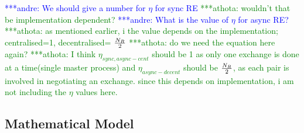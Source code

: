 \documentclass{rspublic}
\newcommand{\alnote}[1]{ {\textcolor{blue} { ***andre: #1 }}}
\newcommand{\athotanote}[1]{ {\textcolor{green} { ***athota: #1 }}}
\newcommand{\alnote}[1]{}
\newcommand{\athotanote}[1]{}
\begin{document}








\alnote{We should give a number for $\eta$ for sync
  RE}\athotanote{wouldn't that be implementation dependent?}
\alnote{What is the value of $\eta$ for async RE?} \athotanote{as
  mentioned earlier, i the value depends on the implementation;
  centralised=1, decentralised= $N_R\over2$} \athotanote{do we need
  the equation here again?}  \athotanote{I think
  $\eta_{sync,async-cent}$ should be 1 as only one exchange is done at
  a time(single master process) and $\eta_{async-decent}$ should be
  $N_R \over 2$, as each pair is involved in negotiating an
  exchange. since this depends on implementation, i am not including
  the $\eta$ values here.}

\subsection{Mathematical Model}
\end{document}
